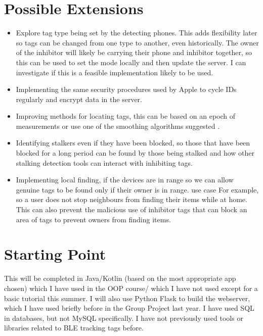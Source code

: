 \documentclass{article}
\begin{document}
\section{Possible Extensions}
\begin{itemize}

\item{Explore tag type being set by the detecting phones. This adds flexibility later so tags can be changed from one type to another, even historically. The owner of the inhibitor will likely be carrying their phone and inhibitor together, so this can be used to set the mode locally and then update the server. I can investigate if this is a feasible implementation likely to be used.}

\item{Implementing the same security procedures used by Apple to cycle IDs regularly and encrypt data in the server.
}

\item{Improving methods for locating tags, this can be based on an epoch of measurements\cite{FingerprintingBLE} or use one of the smoothing algorithms suggested \cite{Smooth}. }

\item{Identifying stalkers even if they have been blocked, so those that have been blocked for a long period can be found by those being stalked and how other stalking detection tools can interact with inhibiting tags.}

\item{Implementing local finding, if the devices are in range so we can allow genuine tags to be found only if their owner is in range. use case For example, so a user does not stop neighbours from finding their items while at home. This can also prevent the malicious use of inhibitor tags that can block an area of tags to prevent owners from finding items.}
\end{itemize}


\section{Starting Point}

This will be completed in Java/Kotlin (based on the most appropriate app chosen) which I have used in the OOP course/ which I have not used except for a basic tutorial this summer.
I will also use Python Flask to build the webserver, which I have used briefly before in the Group Project last year. I have used SQL in databases, but not MySQL specifically. I have not previously used tools or libraries related to BLE tracking tags before.
\end{document}
